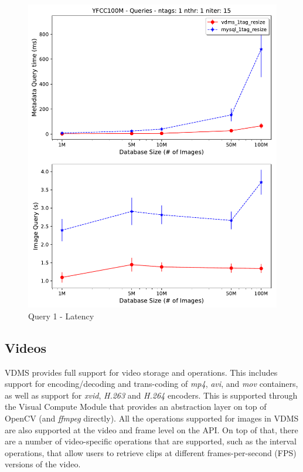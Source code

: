 \begin{figure}[]
\centering
\includegraphics[width=\columnwidth]{figures/q1_latency}
\caption{Query 1 - Latency}
\label{fig:q1_latency}
\end{figure}



\subsection{Videos}
\label{videos}

VDMS provides full support for video storage and operations.
This includes support for encoding/decoding and trans-coding of
\textit{mp4}, \textit{avi}, and \textit{mov} containers,
as well as support for \textit{xvid}, \textit{H.263} and \textit{H.264} encoders.
This is supported through the Visual Compute Module that provides an abstraction
layer on top of OpenCV (and \textit{ffmpeg} directly).
All the operations supported for images in VDMS are also supported at the
video and frame level on the API. On top of that, there are a number of
video-specific operations that are supported, such as the interval operations,
that allow users to retrieve clips at different
frames-per-second (FPS) versions of the video.

